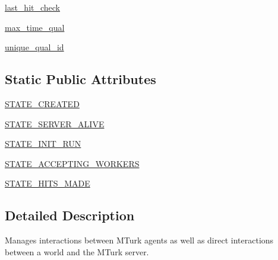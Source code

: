 \begin{DoxyCompactItemize}
\item 
\hyperlink{classparlai_1_1mturk_1_1core_1_1legacy__2018_1_1mturk__manager_1_1MTurkManager_a830168485d86ab5d2803c72b04b92a7f}{last\+\_\+hit\+\_\+check}
\item 
\hyperlink{classparlai_1_1mturk_1_1core_1_1legacy__2018_1_1mturk__manager_1_1MTurkManager_a60da8c405511831f5282e2219f88d565}{max\+\_\+time\+\_\+qual}
\item 
\hyperlink{classparlai_1_1mturk_1_1core_1_1legacy__2018_1_1mturk__manager_1_1MTurkManager_abe3073eb9a13e28f066b873cf20c831a}{unique\+\_\+qual\+\_\+id}
\end{DoxyCompactItemize}
\subsection*{Static Public Attributes}
\begin{DoxyCompactItemize}
\item 
\hyperlink{classparlai_1_1mturk_1_1core_1_1legacy__2018_1_1mturk__manager_1_1MTurkManager_a51fe8406850475f97f1c6ec97b27e6c8}{S\+T\+A\+T\+E\+\_\+\+C\+R\+E\+A\+T\+ED}
\item 
\hyperlink{classparlai_1_1mturk_1_1core_1_1legacy__2018_1_1mturk__manager_1_1MTurkManager_a69a365aa70c94768a6a1f7589c3db247}{S\+T\+A\+T\+E\+\_\+\+S\+E\+R\+V\+E\+R\+\_\+\+A\+L\+I\+VE}
\item 
\hyperlink{classparlai_1_1mturk_1_1core_1_1legacy__2018_1_1mturk__manager_1_1MTurkManager_a537f7af1a479459756b319299155ff88}{S\+T\+A\+T\+E\+\_\+\+I\+N\+I\+T\+\_\+\+R\+UN}
\item 
\hyperlink{classparlai_1_1mturk_1_1core_1_1legacy__2018_1_1mturk__manager_1_1MTurkManager_a0f84d7f78ad42c800f10f923c817f856}{S\+T\+A\+T\+E\+\_\+\+A\+C\+C\+E\+P\+T\+I\+N\+G\+\_\+\+W\+O\+R\+K\+E\+RS}
\item 
\hyperlink{classparlai_1_1mturk_1_1core_1_1legacy__2018_1_1mturk__manager_1_1MTurkManager_ae87d72fd63c78ca5f405690d4c38d8bb}{S\+T\+A\+T\+E\+\_\+\+H\+I\+T\+S\+\_\+\+M\+A\+DE}
\end{DoxyCompactItemize}


\subsection{Detailed Description}
\begin{DoxyVerb}Manages interactions between MTurk agents as well as direct interactions between a
world and the MTurk server.
\end{DoxyVerb}
 

